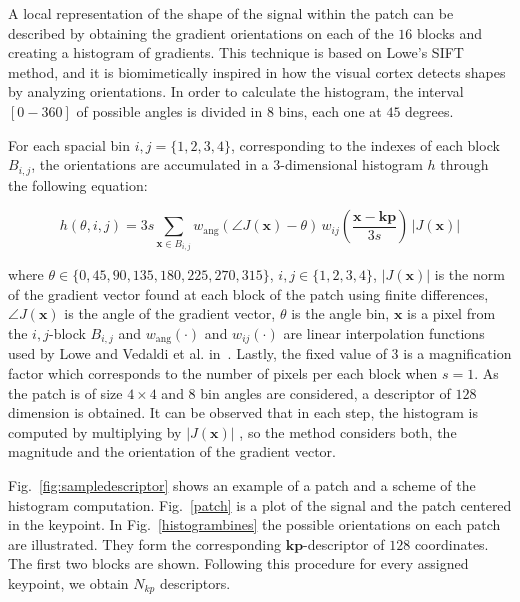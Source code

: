 \documentclass[entropy,article,submit,moreauthors,pdftex,10pt,a4paper]{mdpi}
\begin{document}
A local representation of the shape of the signal within the patch can be described by obtaining the gradient orientations on each of the $16$ blocks and creating a histogram of gradients.  This technique is based on Lowe's SIFT~\citep{Lowe2004} method, and it is biomimetically inspired in how the visual cortex detects shapes by analyzing orientations.   In order to calculate the histogram, the interval $[0-360]$ of possible angles is divided in $8$ bins, each one at $45$ degrees.

 For each spacial bin $ i,j = \{1,2,3,4\} $, corresponding to the indexes of each block $B_{i,j}$,  the orientations are accumulated in a  $3$-dimensional histogram $h$ through the following equation: 
 

\begin{equation}
 h(\theta,i,j) = 3s \sum_{\mathbf{x} \in B_{i,j}} w_\mathrm{ang}(\angle J(\mathbf{x}) - \theta)\, w_{ij}\left(\frac{\mathbf{x} - \mathbf{kp}}{3 s}\right)\, |J(\mathbf{x})|
\label{eq:histogram}
\end{equation}

\noindent  where $ \theta \in \{0, 45, 90, 135, 180, 225, 270, 315\} $, $ i,j \in \{1,2,3,4\} $, $ |J(\mathbf{x})| $ is the norm of the gradient vector found at each block of the patch using finite differences, $\angle J(\mathbf{x}) $ is the angle of the gradient vector,  $\theta$ is the angle bin, $\mathbf{x}$ is a pixel from  the $i,j$-block $B_{i,j}$ and $ w_\mathrm{ang}(\cdot) $  and $ w_{ij}(\cdot) $ are linear interpolation functions used by Lowe and Vedaldi et al. in~\citep{Lowe2004,Vedaldi2010}.  Lastly, the fixed value of $ 3 $ is a magnification factor which corresponds to the number of pixels per each block when $s = 1$.  As the patch is of size $4 \times 4$ and  $8$ bin angles are considered, a descriptor of $128$ dimension is obtained. It can be observed that in each step, the histogram is computed by multiplying by $ |J(\mathbf{x})| $ , so the method considers both, the magnitude and the orientation of the gradient vector. 


Fig.~\ref{fig:sampledescriptor} shows an example of a patch and a scheme of the histogram computation. Fig.~\ref{patch} is a plot of the signal and the patch centered in the keypoint. In Fig.~\ref{histogrambines} the possible orientations on each patch are illustrated. They form the corresponding $\mathbf{kp}$-descriptor of $128$ coordinates. The first two blocks are shown.  Following this procedure for every assigned keypoint, we obtain $N_{kp}$ descriptors.
 
\end{document}
